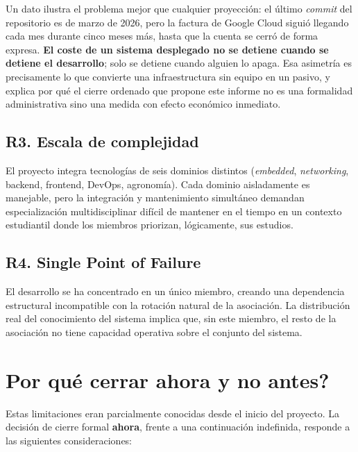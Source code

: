 Un dato ilustra el problema mejor que cualquier proyecci\'on: el
\'ultimo \textit{commit} del repositorio es de marzo de 2026, pero la
factura de Google Cloud sigui\'o llegando cada mes durante cinco meses
m\'as, hasta que la cuenta se cerr\'o de forma expresa. \textbf{El coste
de un sistema desplegado no se detiene cuando se detiene el desarrollo};
solo se detiene cuando alguien lo apaga. Esa asimetr\'ia es precisamente
lo que convierte una infraestructura sin equipo en un pasivo, y explica
por qu\'e el cierre ordenado que propone este informe no es una
formalidad administrativa sino una medida con efecto econ\'omico
inmediato.

\subsection*{R3. Escala de complejidad}

El proyecto integra tecnolog\'ias de seis dominios distintos
(\textit{embedded}, \textit{networking}, backend, frontend, DevOps,
agronom\'ia). Cada dominio aisladamente es manejable, pero la
integraci\'on y mantenimiento simult\'aneo demandan especializaci\'on
multidisciplinar dif\'icil de mantener en el tiempo en un contexto
estudiantil donde los miembros priorizan, l\'ogicamente, sus estudios.

\subsection*{R4. Single Point of Failure}

El desarrollo se ha concentrado en un \'unico miembro, creando una
dependencia estructural incompatible con la rotaci\'on natural de la
asociaci\'on. La distribuci\'on real del conocimiento del sistema
implica que, sin este miembro, el resto de la asociaci\'on no tiene
capacidad operativa sobre el conjunto del sistema.

\section{\textquestiondown Por qu\'e cerrar ahora y no antes?}

Estas limitaciones eran parcialmente conocidas desde el inicio del
proyecto. La decisi\'on de cierre formal \textbf{ahora}, frente a una
continuaci\'on indefinida, responde a las siguientes consideraciones:

